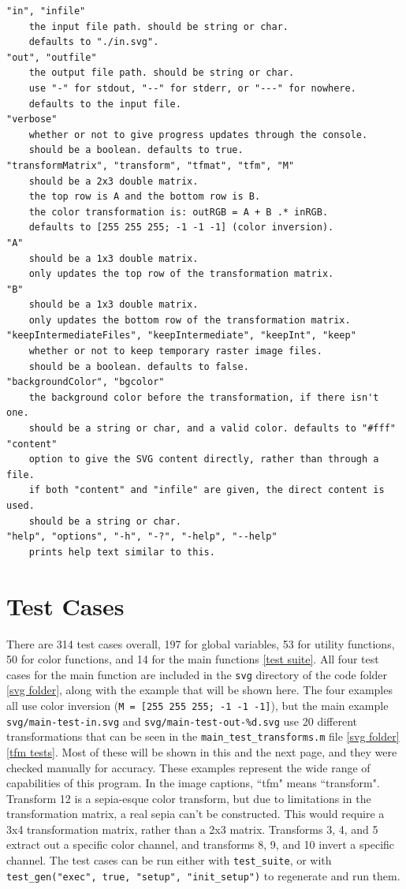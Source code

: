 \documentclass[12pt]{article}
\newcommand \iindent  {\indent \indent}
\newcommand \iiindent {\indent \iindent}
\begin{document}
\begin{verbatim}
"in", "infile"
    the input file path. should be string or char.
    defaults to "./in.svg".
"out", "outfile"
    the output file path. should be string or char.
    use "-" for stdout, "--" for stderr, or "---" for nowhere.
    defaults to the input file.
"verbose"
    whether or not to give progress updates through the console.
    should be a boolean. defaults to true.
"transformMatrix", "transform", "tfmat", "tfm", "M"
    should be a 2x3 double matrix.
    the top row is A and the bottom row is B.
    the color transformation is: outRGB = A + B .* inRGB.
    defaults to [255 255 255; -1 -1 -1] (color inversion).
"A"
    should be a 1x3 double matrix.
    only updates the top row of the transformation matrix.
"B"
    should be a 1x3 double matrix.
    only updates the bottom row of the transformation matrix.
"keepIntermediateFiles", "keepIntermediate", "keepInt", "keep"
    whether or not to keep temporary raster image files.
    should be a boolean. defaults to false.
"backgroundColor", "bgcolor"
    the background color before the transformation, if there isn't one.
    should be a string or char, and a valid color. defaults to "#fff"
"content"
    option to give the SVG content directly, rather than through a file.
    if both "content" and "infile" are given, the direct content is used.
    should be a string or char.
"help", "options", "-h", "-?", "-help", "--help"
    prints help text similar to this.
\end{verbatim}

\section{Test Cases}

\iiindent There are 314 test cases overall, 197 for global variables, 53 for utility
functions, 50 for color functions, and 14 for the main functions \ref{test suite}.
All four test cases for the main function are included in the {\tt svg} directory
of the code folder \ref{svg folder}, along with the example that will be shown here.
The four examples all use color inversion ({\tt M = [255 255 255; -1 -1 -1]}), but
the main example {\tt svg/main-test-in.svg} and {\tt svg/main-test-out-\%d.svg} use
20 different transformations that can be seen in the {\tt main\_test\_transforms.m}
file \ref{svg folder}\ref{tfm tests}. Most of these will be shown in this and the
next page, and they were checked manually for accuracy. These examples represent the
wide range of capabilities of this program. In the image captions, ``tfm" means
``transform". Transform 12 is a sepia-esque color transform, but due to limitations
in the transformation matrix, a real sepia can't be constructed. This would require
a 3x4 transformation matrix, rather than a 2x3 matrix. Transforms 3, 4, and 5 extract
out a specific color channel, and transforms 8, 9, and 10 invert a specific channel. The test cases can be run either with {\tt test\_suite}, or with
{\tt test\_gen("exec", true, "setup", "init\_setup")} to regenerate and run them.
\end{document}
